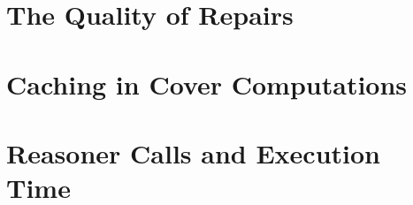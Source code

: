 \section{The Quality of Repairs}\label{eval-quality}



\section{Caching in Cover Computations}



\section{Reasoner Calls and Execution Time}


